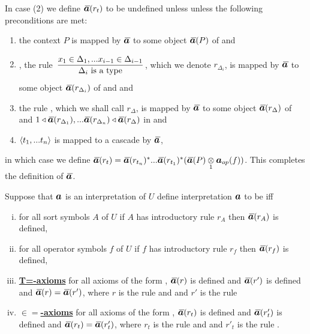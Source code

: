 \begin{definition} 
\begin{enumerate}[(i)]
In  case (2) 
we define $\Ibar(r_t)$ to be undefined unless  unless the following preconditions are met:
\begin{enumerate}
\item
the context  $P$ is mapped by $\Ibar$ to some object $\Ibar(P)$ of \catcw and 
\item
\foreachi, the rule $\IDelta{i}$, which we denote $r_{\Delta_i}$, is mapped by $\Ibar$ to some object $\Ibar(r_{\Delta_i})$ of \catcw
and  
and 
\item the rule \ZDelta, which we shall call $r_\Delta$, is mapped by $\Ibar$ to some object $\Ibar(r_\Delta)$ of \catcw and
$1 \base \Ibar(r_{\Delta_1}),...\Ibar(r_{\Delta_n}) \base \Ibar(r_\Delta)$ in \catcw 
and 
\item
$\langle t_1,...t_n\rangle$ is mapped to a cascade by $\Ibar$,
\end{enumerate}
in which case we
define $\Ibar(r_t)=\Ibar(r_{t_n})^*...\Ibar(r_{t_1})^*(\crossx{\Ibar(P)}{\iI_{op}(f)}{1})$.
This completes the definition of $\Ibar$.
\end{enumerate}
\end{definition}


\def\restrict{\mathbin{\restriction}}
\newcommand{\predInstance}{\overline{I \restrict U_p}}
\newcommand{\Uincrement}{U \setminus\kern-2pt U_p}

\begin{definition}
 Suppose that $\iI$ is an interpretation of $U$  
define interpretation $\iI$ to be   iff 

\begin{enumerate}[(i)]
\item
for all sort symbols $A$ of $U$ if $A$ has introductory rule $r_A$ then $\Ibar(r_A)$ is defined,
\item  
for all operator symbols $f$ of $U$ if $f$ has introductory rule $r_f$ then $\Ibar(r_f)$ is defined,

\item \underline{\textbf{T=-axioms}} 
for all axioms of the form
 ,
$\Ibar(r)$ is defined and $\Ibar(r')$ is defined and
$\Ibar(r) = \Ibar(r')$, where $r$ is the rule
\ZDelta and  
and $r'$ is the rule \ZDeltap[,]

\item \underline{\textbf{$\boldsymbol{\in=}$-axioms}} 
for all axioms  of the form
,
$\Ibar(r_t)$ is defined and  $\Ibar(r'_t)$ is defined and
$\Ibar(r_t) = \Ibar(r'_t)$, where $r_t$ is the rule
\ZtDelta and  
and $r'_t$ is the rule .
\end{enumerate}
\end{definition}

